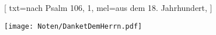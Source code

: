 [
    txt={nach Psalm 106, 1},
    mel={aus dem 18. Jahrhundert},
    ]

\centering\texttt{[image: Noten/DanketDemHerrn.pdf]}

\endsong
